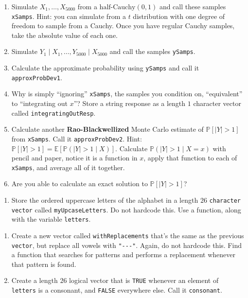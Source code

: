 \documentclass[
  12pt,
  krantz2]{krantz}
\providecommand{\tightlist}{%
  \setlength{\itemsep}{0pt}\setlength{\parskip}{0pt}}
\begin{document}
\begin{enumerate}
\def\labelenumi{\alph{enumi}.}
\item
  Simulate \(X_1, \ldots, X_{5000}\) from a \(\text{half-Cauchy}(0, 1)\) and call these samples \texttt{xSamps}. Hint: you can simulate from a \(t\) distribution with one degree of freedom to sample from a Cauchy. Once you have regular Cauchy samples, take the absolute value of each one.
\item
  Simulate \(Y_1 \mid X_1, \ldots, Y_{5000} \mid X_{5000}\) and call the samples \texttt{ySamps}.
\item
  Calculate the approximate probability using \texttt{ySamps} and call it \texttt{approxProbDev1}.
\item
  Why is simply ``ignoring'' \texttt{xSamps}, the samples you condition on, ``equivalent'' to ``integrating out \(x\)''? Store a string response as a length \(1\) character vector called \texttt{integratingOutResp}.
\item
  Calculate another \textbf{Rao-Blackwellized} Monte Carlo estimate of \(\mathbb{P}[|Y| > 1]\) from \texttt{xSamps}. Call it \texttt{approxProbDev2}. Hint: \(\mathbb{P}[|Y| > 1] = \mathbb{E}[\mathbb{P}(|Y| > 1 \mid X) ]\). Calculate \(\mathbb{P}(|Y| > 1 \mid X=x)\) with pencil and paper, notice it is a function in \(x\), apply that function to each of \texttt{xSamps}, and average all of it together.
\item
  Are you able to calculate an exact solution to \(\mathbb{P}[|Y| > 1]\)?
\end{enumerate}

\begin{enumerate}
\def\labelenumi{\arabic{enumi}.}
\setcounter{enumi}{3}
\tightlist
\item
  Store the ordered uppercase letters of the alphabet in a length \(26\) \texttt{character} \texttt{vector} called \texttt{myUpcaseLetters}. Do not hardcode this. Use a function, along with the variable \texttt{letters}.
\end{enumerate}

\begin{enumerate}
\def\labelenumi{\alph{enumi}.}
\item
  Create a new vector called \texttt{withReplacements} that's the same as the previous \texttt{vector}, but replace all vowels with \texttt{"-\/-\/-"}. Again, do not hardcode this. Find a function that searches for patterns and performs a replacement whenever that pattern is found.
\item
  Create a length \(26\) logical vector that is \texttt{TRUE} whenever an element of \texttt{letters} is a consonant, and \texttt{FALSE} everywhere else. Call it \texttt{consonant}.
\end{enumerate}
\end{document}
